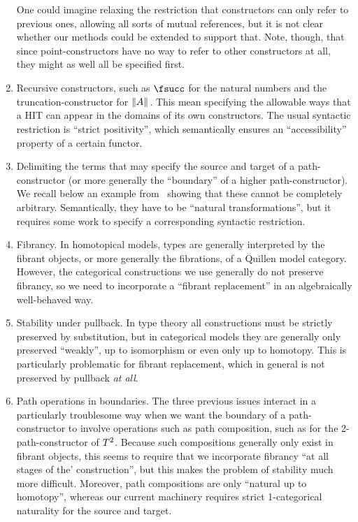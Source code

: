 \documentclass{amsart}
\begin{document}
\begin{enumerate}
  One could imagine relaxing the restriction that constructors can only refer to previous ones, allowing all sorts of mutual references, but it is not clear whether our methods could be extended to support that.
  Note, though, that since point-constructors have no way to refer to other constructors at all, they might as well all be specified first.
\item Recursive constructors, such as $\fsucc$ for the natural numbers and the truncation-constructor for $\mathopen{}\left\Vert A\right\Vert_{}\mathclose{}$.
  This mean specifying the allowable ways that a HIT can appear in the domains of its own constructors.
  The usual syntactic restriction is ``strict positivity'', which semantically ensures an ``accessibility'' property of a certain functor.
\item Delimiting the terms that may specify the source and target of a path-constructor (or more generally the ``boundary'' of a higher path-constructor).
  We recall below an example from~\cite[\S6.13]{hottbook} showing that these cannot be completely arbitrary.
  Semantically, they have to be ``natural transformations'', but it requires some work to specify a corresponding syntactic restriction.\label{item:issue:naturality}
\item Fibrancy.
  In homotopical models, types are generally interpreted by the fibrant objects, or more generally the fibrations, of a Quillen model category.
  However, the categorical constructions we use generally do not preserve fibrancy, so we need to incorporate a ``fibrant replacement'' in an algebraically well-behaved way.
\item Stability under pullback.
  In type theory all constructions must be strictly preserved by substitution, but in categorical models they are generally only preserved ``weakly'', up to isomorphism or even only up to homotopy.
  This is particularly problematic for fibrant replacement, which in general is not preserved by pullback \emph{at all}.
\item Path operations in boundaries.
  The three previous issues interact in a particularly troublesome way when we want the boundary of a path-constructor to involve operations such as path composition, such as for the 2-path-constructor of $T^2$.
  Because such compositions generally only exist in fibrant objects, this seems to require that we incorporate fibrancy ``at all stages of the' construction'', but this makes the problem of stability much more difficult.
  Moreover, path compositions are only ``natural up to homotopy'', whereas our current machinery requires strict 1-categorical naturality for the source and target.

\end{enumerate}
\end{document}
